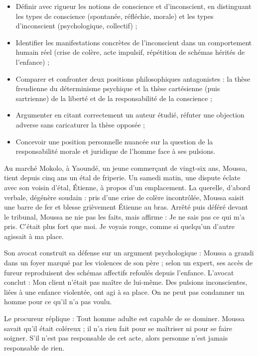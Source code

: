 \documentclass[11pt]{article}
\newcommand{\cle}[1]{{\popxbold\color{popdark}#1}}
\newcounter{popsec}
\newcounter{popsub}
\newcommand{\courssub}[1]{%
  \stepcounter{popsub}%
  \par\vspace{9pt}\noindent{\popxbold\fontsize{11.5}{13}\selectfont\color{popink}{\color{poporange}\thepopsec.\thepopsub}\hspace{6pt}#1}\par\nopagebreak\vspace{4pt}
}
\begin{document}
\begin{itemize}
\item \cle{Définir} avec rigueur les notions de conscience et d'inconscient, en distinguant les types de conscience (spontanée, réfléchie, morale) et les types d'inconscient (psychologique, collectif) ;
\item \cle{Identifier} les manifestations concrètes de l'inconscient dans un comportement humain réel (crise de colère, acte impulsif, répétition de schémas hérités de l'enfance) ;
\item \cle{Comparer} et confronter deux positions philosophiques antagonistes : la thèse freudienne du déterminisme psychique et la thèse cartésienne (puis sartrienne) de la liberté et de la responsabilité de la conscience ;
\item \cle{Argumenter} en citant correctement un auteur étudié, \cle{réfuter} une objection adverse sans caricaturer la thèse opposée ;
\item \cle{Concevoir} une position personnelle nuancée sur la question de la responsabilité morale et juridique de l'homme face à ses pulsions.
\end{itemize}

\courssub{Situation}

Au marché Mokolo, à Yaoundé, un jeune commerçant de vingt-six ans, Moussa, tient depuis cinq ans un étal de friperie. Un samedi matin, une dispute éclate avec son voisin d'étal, Étienne, à propos d'un emplacement. La querelle, d'abord verbale, dégénère soudain : pris d'une crise de colère incontrôlée, Moussa saisit une barre de fer et blesse grièvement Étienne au bras. Arrêté puis déféré devant le tribunal, Moussa ne nie pas les faits, mais affirme : \guillemotleft Je ne sais pas ce qui m'a pris. C'était plus fort que moi. Je voyais rouge, comme si quelqu'un d'autre agissait à ma place.\guillemotright

Son avocat construit sa défense sur un argument psychologique : Moussa a grandi dans un foyer marqué par les violences de son père ; selon un expert, ses accès de fureur reproduisent des schémas affectifs refoulés depuis l'enfance. L'avocat conclut : \guillemotleft Mon client n'était pas maître de lui-même. Des pulsions inconscientes, liées à une enfance violentée, ont agi à sa place. On ne peut pas condamner un homme pour ce qu'il n'a pas voulu.\guillemotright

Le procureur réplique : \guillemotleft Tout homme adulte est capable de se dominer. Moussa savait qu'il était coléreux ; il n'a rien fait pour se maîtriser ni pour se faire soigner. S'il n'est pas responsable de cet acte, alors personne n'est jamais responsable de rien.\guillemotright
\end{document}
